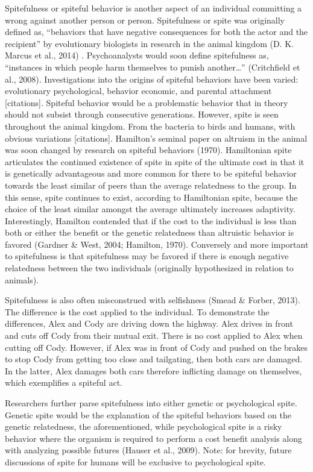\documentclass[
  english,
  donotrepeattitle,doc, 12pt, a4paper,floatsintext]{apa7}
\begin{document}
Spitefulness or spiteful behavior is another aspect of an individual committing a wrong against another person or person. Spitefulness or spite was originally defined as, ``behaviors that have negative consequences for both the actor and the recipient'' by evolutionary biologists in research in the animal kingdom (D. K. Marcus et al., 2014) . Psychoanalysts would soon define spitefulness as, ``instances in which people harm themselves to punish another\ldots{}'' (Critchfield et al., 2008). Investigations into the origins of spiteful behaviors have been varied: evolutionary psychological, behavior economic, and parental attachment {[}citations{]}. Spiteful behavior would be a problematic behavior that in theory should not subsist through consecutive generations. However, spite is seen throughout the animal kingdom. From the bacteria to birds and humans, with obvious variations {[}citations{]}. Hamilton's seminal paper on altruism in the animal was soon changed by research on spiteful behaviors (1970). Hamiltonian spite articulates the continued existence of spite in spite of the ultimate cost in that it is genetically advantageous and more common for there to be spiteful behavior towards the least similar of peers than the average relatedness to the group. In this sense, spite continues to exist, according to Hamiltonian spite, because the choice of the least similar amongst the average ultimately increases adaptivity. Interestingly, Hamilton contended that if the cost to the individual is less than both or either the benefit or the genetic relatedness than altruistic behavior is favored (Gardner \& West, 2004; Hamilton, 1970). Conversely and more important to spitefulness is that spitefulness may be favored if there is enough negative relatedness between the two individuals (originally hypothesized in relation to animals).

Spitefulness is also often misconstrued with selfishness (Smead \& Forber, 2013). The difference is the cost applied to the individual. To demonstrate the differences, Alex and Cody are driving down the highway. Alex drives in front and cuts off Cody from their mutual exit. There is no cost applied to Alex when cutting off Cody. However, if Alex was in front of Cody and pushed on the brakes to stop Cody from getting too close and tailgating, then both cars are damaged. In the latter, Alex damages both cars therefore inflicting damage on themselves, which exemplifies a spiteful act.

Researchers further parse spitefulness into either genetic or psychological spite. Genetic spite would be the explanation of the spiteful behaviors based on the genetic relatedness, the aforementioned, while psychological spite is a risky behavior where the organism is required to perform a cost benefit analysis along with analyzing possible futures (Hauser et al., 2009). Note: for brevity, future discussions of spite for humans will be exclusive to psychological spite.
\end{document}

